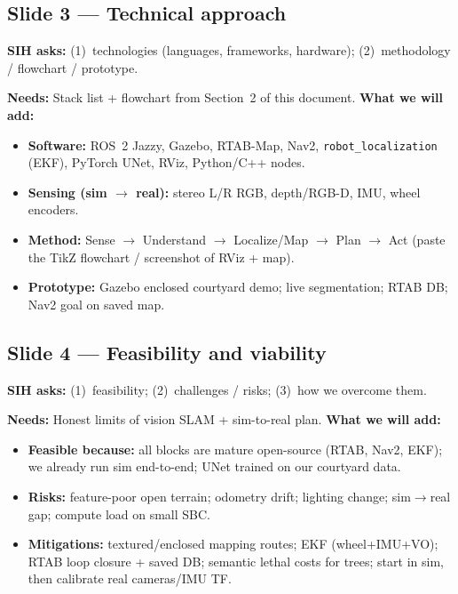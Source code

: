 \documentclass[11pt,a4paper]{article}
\newcommand{\needs}[1]{\textbf{Needs:} #1}
\begin{document}
\subsection{Slide 3 --- Technical approach}

\textbf{SIH asks:}
(1)~technologies (languages, frameworks, hardware);
(2)~methodology / flowchart / prototype.

\needs{Stack list + flowchart from Section~2 of this document.}
\textbf{What we will add:}
\begin{itemize}[nosep,leftmargin=*]
  \item \textbf{Software:} ROS~2 Jazzy, Gazebo, RTAB-Map, Nav2, \texttt{robot\_localization} (EKF),
        PyTorch UNet, RViz, Python/C++ nodes.
  \item \textbf{Sensing (sim $\rightarrow$ real):} stereo L/R RGB, depth/RGB-D, IMU, wheel encoders.
  \item \textbf{Method:} Sense $\rightarrow$ Understand $\rightarrow$ Localize/Map $\rightarrow$ Plan $\rightarrow$ Act
        (paste the TikZ flowchart / screenshot of RViz + map).
  \item \textbf{Prototype:} Gazebo enclosed courtyard demo; live segmentation; RTAB DB;
        Nav2 goal on saved map.
\end{itemize}

\subsection{Slide 4 --- Feasibility and viability}

\textbf{SIH asks:}
(1)~feasibility;
(2)~challenges / risks;
(3)~how we overcome them.

\needs{Honest limits of vision SLAM + sim-to-real plan.}
\textbf{What we will add:}
\begin{itemize}[nosep,leftmargin=*]
  \item \textbf{Feasible because:} all blocks are mature open-source (RTAB, Nav2, EKF);
        we already run sim end-to-end; UNet trained on our courtyard data.
  \item \textbf{Risks:} feature-poor open terrain; odometry drift; lighting change;
        sim$\rightarrow$real gap; compute load on small SBC.
  \item \textbf{Mitigations:} textured/enclosed mapping routes; EKF (wheel+IMU+VO);
        RTAB loop closure + saved DB; semantic lethal costs for trees; start in sim,
        then calibrate real cameras/IMU TF.
\end{itemize}
\end{document}
